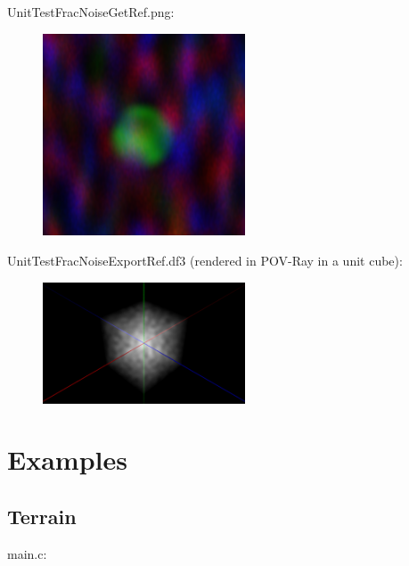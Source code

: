UnitTestFracNoiseGetRef.png:\\
\begin{center}
\begin{figure}[H]
\centering\includegraphics[width=6cm]{./UnitTestFracNoiseGetRef.png}\\
\end{figure}
\end{center}

UnitTestFracNoiseExportRef.df3 (rendered in POV-Ray in a unit cube):\\
\begin{center}
\begin{figure}[H]
\centering\includegraphics[width=6cm]{./DF3.png}\\
\end{figure}
\end{center}

\section{Examples}

\subsection{Terrain}

main.c:\\
\begin{scriptsize}
\begin{ttfamily}

\end{ttfamily}
\end{scriptsize}

